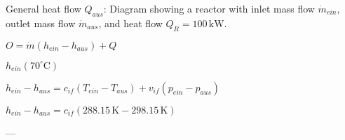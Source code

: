 General heat flow \( Q_{aus} \):  
Diagram showing a reactor with inlet mass flow \( \dot{m}_{ein} \), outlet mass flow \( \dot{m}_{aus} \), and heat flow \( Q_R = 100 \, \text{kW} \).  

\( O = \dot{m} (h_{ein} - h_{aus}) + Q \)  

\( h_{ein} (70^\circ \text{C}) \)  

\( h_{ein} - h_{aus} = c_{if} (T_{ein} - T_{aus}) + v_{if} (p_{ein} - p_{aus}) \)  

\( h_{ein} - h_{aus} = c_{if} (288.15 \, \text{K} - 298.15 \, \text{K}) \)  

---